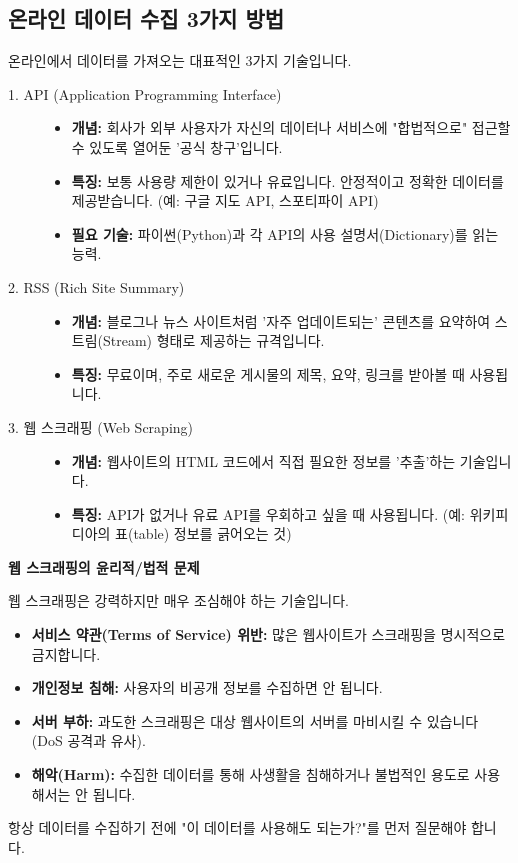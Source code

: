 \documentclass[11pt,a4paper]{book}
\theoremstyle{definition}
\begin{document}
\subsection{온라인 데이터 수집 3가지 방법}

온라인에서 데이터를 가져오는 대표적인 3가지 기술입니다.

\begin{description}
    \item[1. API (Application Programming Interface)]
    \begin{itemize}
        \item \textbf{개념:} 회사가 외부 사용자가 자신의 데이터나 서비스에 "합법적으로" 접근할 수 있도록 열어둔 '공식 창구'입니다.
        \item \textbf{특징:} 보통 사용량 제한이 있거나 유료입니다. 안정적이고 정확한 데이터를 제공받습니다. (예: 구글 지도 API, 스포티파이 API)
        \item \textbf{필요 기술:} 파이썬(Python)과 각 API의 사용 설명서(Dictionary)를 읽는 능력.
    \end{itemize}

    \item[2. RSS (Rich Site Summary)]
    \begin{itemize}
        \item \textbf{개념:} 블로그나 뉴스 사이트처럼 '자주 업데이트되는' 콘텐츠를 요약하여 스트림(Stream) 형태로 제공하는 규격입니다.
        \item \textbf{특징:} 무료이며, 주로 새로운 게시물의 제목, 요약, 링크를 받아볼 때 사용됩니다.
    \end{itemize}

    \item[3. 웹 스크래핑 (Web Scraping)]
    \begin{itemize}
        \item \textbf{개념:} 웹사이트의 HTML 코드에서 직접 필요한 정보를 '추출'하는 기술입니다.
        \item \textbf{특징:} API가 없거나 유료 API를 우회하고 싶을 때 사용됩니다. (예: 위키피디아의 표(table) 정보를 긁어오는 것)
    \end{itemize}
\end{description}

\begin{warningbox}
\textbf{웹 스크래핑의 윤리적/법적 문제}

웹 스크래핑은 강력하지만 매우 조심해야 하는 기술입니다.
\begin{itemize}
    \item \textbf{서비스 약관(Terms of Service) 위반:} 많은 웹사이트가 스크래핑을 명시적으로 금지합니다.
    \item \textbf{개인정보 침해:} 사용자의 비공개 정보를 수집하면 안 됩니다.
    \item \textbf{서버 부하:} 과도한 스크래핑은 대상 웹사이트의 서버를 마비시킬 수 있습니다 (DoS 공격과 유사).
    \item \textbf{해악(Harm):} 수집한 데이터를 통해 사생활을 침해하거나 불법적인 용도로 사용해서는 안 됩니다.
\end{itemize}
항상 데이터를 수집하기 전에 "이 데이터를 사용해도 되는가?"를 먼저 질문해야 합니다.
\end{warningbox}
\end{document}
